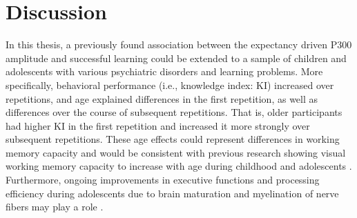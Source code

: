 \section{Discussion}\label{Discussion}
In this thesis, a previously found association between the expectancy driven P300 amplitude and successful learning \parencite[e.g.,][]{steinemannTrackingNeuralCorrelates2016,strzelczykNeurophysiologicalMarkersSuccessful2022} could be extended to a sample of children and adolescents with various psychiatric disorders and learning problems. More specifically, behavioral performance (i.e., knowledge index: KI) increased over repetitions, and age explained differences in the first repetition, as well as differences over the course of subsequent repetitions. That is, older participants had higher KI in the first repetition and increased it more strongly over subsequent repetitions. These age effects could represent differences in working memory capacity and would be consistent with previous research showing visual working memory capacity to increase with age during childhood and adolescents \parencite{cowanCapacityAttentionIts2005}. Furthermore, ongoing improvements in executive functions and processing efficiency during adolescents due to brain maturation and myelination of nerve fibers may play a role \parencite{andersonDevelopmentExecutiveFunctions2001}.  
